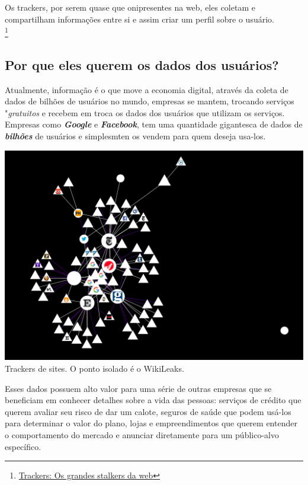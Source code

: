\documentclass[12pt, letterpaper]{report}
\begin{document}
	Os trackers, por serem quase que onipresentes na web, eles coletam e compartilham informações entre si e assim criar um perfil sobre o usuário.\\

\footnote{\href{https://antivigilancia.org/pt/2015/11/trackers-os-grandes-stalkers-da-web/}{Trackers: Os grandes stalkers da web}}

\subsection{Por que eles querem os dados dos usuários?}
	Atualmente, informação é o que move a economia digital, através da coleta de dados de bilhões de usuários no mundo, empresas se mantem, trocando serviços "\textit{gratuitos} e recebem em troca os dados dos usuários que utilizam os serviços. Empresas como \textbf{\textit{Google}} e \textbf{\textit{Facebook}}, tem uma quantidade gigantesca de dados de \textbf{\textit{bilhões}} de usuários e simplesmten os vendem para quem deseja usa-los.\\

	\begin{center} %
		\includegraphics[scale=0.7]{trackers1.png}\\
		\footnotesize Trackers de sites. O ponto isolado é o WikiLeaks.
	\end{center}


	Esses dados possuem alto valor para uma série de outras empresas que se beneficiam em conhecer detalhes sobre a vida das pessoas: serviços de crédito que querem avaliar seu risco de dar um calote, seguros de saúde que podem usá-los para determinar o valor do plano, lojas e empreendimentos que querem entender o comportamento do mercado e anunciar diretamente para um público-alvo específico.\\
\end{document}
